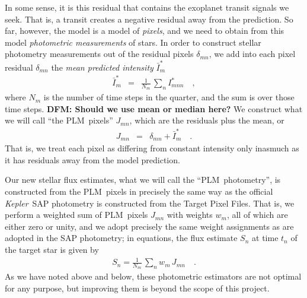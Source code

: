 \documentclass[12pt, preprint]{aastex}
\newcommand{\project}[1]{\textsl{#1}}
\newcommand{\Kepler}{\project{Kepler}}
\newcommand{\name}{PLM}
\newcommand{\todo}[1]{\textbf{#1}}
\begin{document}
In some sense, it is this residual that contains the exoplanet transit signals we seek.
That is, a transit creates a negative residual away from the prediction.
So far, however, the model is a model of \emph{pixels},
  and we need to obtain from this model \emph{photometric measurements} of stars.
In order to construct stellar photometry measurements out of the residual pixels $\delta_{mn}$,
  we add into each pixel residual $\delta_{mn}$ the \emph{mean predicted intensity} $\bar{I}^{\ast}_m$
\begin{eqnarray}
\bar{I}^{\ast}_m &=& \frac{1}{N_m}\,\sum_n I^{\ast}_{mnn}
\quad ,
\end{eqnarray}
where $N_m$ is the number of time steps in the quarter,
  and the sum is over those time steps.
\todo{DFM: Should we use mean or median here?}
We construct what we will call ``the \name\ pixels'' $J_{mn}$,
  which are the residuals plus the mean, or
\begin{eqnarray}
J_{mn} &=& \delta_{mn} + \bar{I}^{\ast}_m
\quad .
\end{eqnarray}
That is, we treat each pixel as differing from constant intensity
  only inasmuch as it has residuals away from the model prediction.

Our new stellar flux estimates,
  what we will call the ``\name\ photometry'',
  is constructed from the \name\ pixels
  in precisely the same way as the official \Kepler\ SAP photometry
  is constructed from the Target Pixel Files.
That is, we perform a weighted sum of \name\ pixels $J_{mn}$ with weights $w_m$,
  all of which are either zero or unity,
  and we adopt precisely the same weight assignments as are adopted in the SAP photometry;
  in equations, the flux estimate $S_n$ at time $t_n$ of the target star is given by
\begin{eqnarray}
S_n = \frac{1}{N_m}\,\sum_n w_m\,J_{mn}
\quad .
\end{eqnarray}
As we have noted above and below, these photometric estimators are not optimal for any purpose,
  but improving them is beyond the scope of this project.
\end{document}
